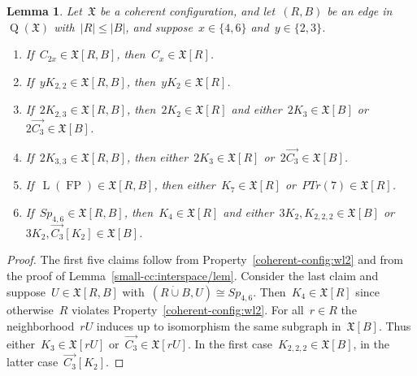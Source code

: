 \documentclass[english,a4paper]{article}
\theoremstyle{plain}
\newtheorem{lemma}      [theorem]{Lemma}
\theoremstyle{definition}
\newcommand{\abs}[1]{| #1 |}
\newcommand{\disjointUnion}{\ensuremath{\mathbin{\dot{\cup}}}}
\newcommand{\coherentConfig}{\ensuremath{\mathfrak{X}}}
\newcommand{\interspace}[2]{\ensuremath{\coherentConfig[#1,#2]}}
\newcommand{\inducedCC}[1]{\ensuremath{\coherentConfig[#1]}}
\DeclareMathOperator*{\Quotient}{Q}
\newcommand{\quotientGraph}[1]{\ensuremath{\Quotient(#1)}}
\newcommand{\matchingCC}[1]{\ensuremath{\disjointCliques{#1}{2}}}
\newcommand{\clique}[1]{\ensuremath{K_{#1}}}
\newcommand{\cycle}[1]{\ensuremath{C_{#1}}}
\newcommand{\disjointCliques}[2]{\ensuremath{#1 \clique{#2}}}
\DeclareMathOperator{\fanoPlane}{FP}
\DeclareMathOperator{\LeviGraph}{L}
\newcommand{\leviGraph}[1]{\ensuremath{\LeviGraph\!\left(#1\right)}}
\newcommand{\leviFano}{\leviGraph{\fanoPlane}}
\newcommand{\interspaceFourSix}{\ensuremath{Sp_{4,6}}}
\begin{document}
\begin{lemma}
\label{small-cc:interspace-implies-cc/lem}
    Let~$\coherentConfig$ be a coherent configuration, and let~$(R,B)$ be an edge in~$\quotientGraph{\coherentConfig}$ with~$\abs{R} \leq \abs{B}$, and suppose~$x \in \{4,6\}$ and~$y \in \{2,3\}$.
    \begin{enumerate}[label = (\arabic*)]
        \item
        If~$\cycle{2x} \in \interspace{R}{B}$, then~$\cycle{x} \in \inducedCC{R}$.
        \item
        If~$y\clique{2,2} \in \interspace{R}{B}$, then~$\disjointCliques{y}{2} \in \inducedCC{R}$.
        \item
        If~$\disjointCliques{2}{2,3} \in \interspace{R}{B}$, then~$\matchingCC{2} \in \inducedCC{R}$ and either~$\disjointCliques{2}{3} \in \inducedCC{B}$ or~$2\overrightarrow{C_3} \in \inducedCC{B}$.
        \item
        If~$\disjointCliques{2}{3,3} \in \interspace{R}{B}$, then either~$\disjointCliques{2}{3} \in \inducedCC{R}$ or~$2\overrightarrow{\cycle{3}} \in \inducedCC{B}$.
        \item
        If~$\leviFano \in \interspace{R}{B}$, then either~$\clique{7} \in \inducedCC{R}$ or~$PTr(7) \in \inducedCC{R}$.
        \item
        If~$\interspaceFourSix \in \interspace{R}{B}$, then~$\clique{4} \in \inducedCC{R}$ and either~$\matchingCC{3}, K_{2,2,2} \in \inducedCC{B}$ or~$\matchingCC{3},\overrightarrow{\cycle{3}}[\clique{2}] \in \inducedCC{B}$.
    \end{enumerate}
\end{lemma}
\begin{proof}
    The first five claims follow from Property~\ref{coherent-config:wl2} and from the proof of Lemma~\ref{small-cc:interspace/lem}.
    Consider the last claim and suppose~$U \in \interspace{R}{B}$ with~$(R \disjointUnion B, U) \cong \interspaceFourSix$.
    Then~$\clique{4} \in \inducedCC{R}$ since otherwise~$R$ violates Property~\ref{coherent-config:wl2}.
    For all~$r \in R$ the neighborhood~$rU$ induces up to isomorphism the same subgraph in~$\inducedCC{B}$.
    Thus either~$\clique{3} \in \inducedCC{rU}$ or~$\overrightarrow{\cycle{3}} \in \inducedCC{rU}$.
    In the first case~$\clique{2,2,2} \in \inducedCC{B}$, in the latter case~$\overrightarrow{\cycle{3}}[\clique{2}]$.
\end{proof}
\end{document}
